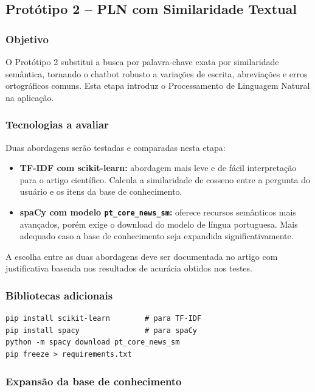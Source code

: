 \subsection{Protótipo 2 -- PLN com Similaridade Textual}

\subsubsection{Objetivo}

O Protótipo 2 substitui a busca por palavra-chave exata por similaridade semântica, tornando o chatbot robusto a variações de escrita, abreviações e erros ortográficos comuns. Esta etapa introduz o Processamento de Linguagem Natural na aplicação.

\subsubsection{Tecnologias a avaliar}

Duas abordagens serão testadas e comparadas nesta etapa:

\begin{itemize}
    \item \textbf{TF-IDF com scikit-learn:} abordagem mais leve e de fácil interpretação para o artigo científico. Calcula a similaridade de cosseno entre a pergunta do usuário e os itens da base de conhecimento.
    \item \textbf{spaCy com modelo \texttt{pt\_core\_news\_sm}:} oferece recursos semânticos mais avançados, porém exige o download do modelo de língua portuguesa. Mais adequado caso a base de conhecimento seja expandida significativamente.
\end{itemize}

A escolha entre as duas abordagens deve ser documentada no artigo com justificativa baseada nos resultados de acurácia obtidos nos testes.

\subsubsection{Bibliotecas adicionais}

\begin{verbatim}
pip install scikit-learn        # para TF-IDF
pip install spacy               # para spaCy
python -m spacy download pt_core_news_sm
pip freeze > requirements.txt
\end{verbatim}

\subsubsection{Expansão da base de conhecimento}

